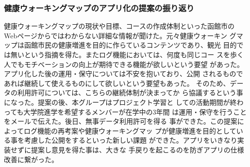 ﻿\subsubsection{健康ウォーキングマップのアプリ化の提案の振り返り}
健康ウォーキングマップの現状や目標、コースの作成体制といった函館市の
Webページからではわからない詳細な情報が聞けた。元々健康ウォーキン
グマップは函館市民の健康増進を目的に作らているコンテンツであり、観光
目的では無いという指摘を得た。またログ機能においては、何度も同じコー
スを歩く人でもモチベーションの向上が期待できる機能が欲しいという要望
があった。アプリ化した後の運用・保守については不安を抱いており、公開
されるものであれば継続して使えるものにして欲しいという要望もあった。
そのため、データの利用許可については、こちらの継続体制が決まってか
ら協議するという事になった。提案の後、本グループはプロジェクト学習と
しての活動期間が終わっても大学院進学を希望するメンバーが在学中の3年間
は運用・保守を行うことをメールで伝えた。後日、無事データ利用許可を得る
事ができた。この提案によってログ機能の再考案や健康ウォーキングマッ
プが健康増進を目的としている事を考慮した公開をするといった新しい課題
ができた。アプリをいきなり実装せずに提案し意見を得た事は、大きな
手戻りを起こるのを防ぎアプリの仕様改善に繋がった。

